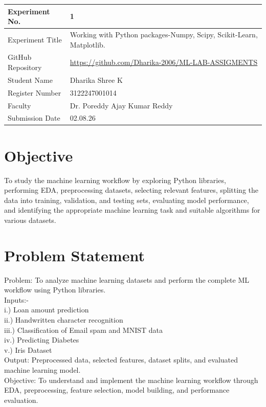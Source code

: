 \documentclass[12pt,a4paper]{article}
\begin{document}
\begin{tabular}{|p{4cm}|p{11cm}|}
\hline
Experiment No. & 1 \\ \hline
Experiment Title & Working with Python packages-Numpy, Scipy, Scikit-Learn,
Matplotlib.\\ \hline
GitHub Repository & \url{https://github.com/Dharika-2006/ML-LAB-ASSIGMENTS} \\ \hline
Student Name & Dharika Shree K\\ \hline
Register Number & 3122247001014 \\ \hline
Faculty & Dr. Poreddy Ajay Kumar Reddy \\ \hline
Submission Date & 02.08.26\\ \hline
\end{tabular}

\section{Objective}
To study the machine learning workflow by exploring Python libraries, performing EDA, preprocessing datasets, selecting relevant features, splitting the data into training, validation, and testing sets, evaluating model performance, and identifying the appropriate machine learning task and suitable algorithms for various datasets.

\section{Problem Statement}
Problem: To analyze machine learning datasets and perform the complete ML workflow using Python libraries.
\\Inputs:-\\
i.) Loan amount prediction\\ 
ii.) Handwritten character recognition\\
iii.) Classification of Email spam and MNIST data\\
iv.) Predicting Diabetes\\
v.) Iris Dataset\\
Output: Preprocessed data, selected features, dataset splits, and evaluated machine learning model.
\\Objective: To understand and implement the machine learning workflow through EDA, preprocessing, feature selection, model building, and performance evaluation.
\end{document}
